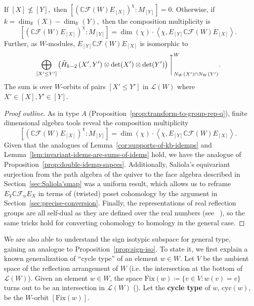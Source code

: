 \documentclass[ALCO, Unicode]{cedram}
\def\C{{\mathbb{C}}}
\begin{document}
 \begin{prop}\label{gen-of-cor:induced-cohomology}
      If $[X]\nleq [Y],$ then $\left[\left(\C \mathcal{F}(W) E_{[X]}\right)^\chi:M_{[Y]}\right] = 0.$ Otherwise, if $k = \dim_{\mathbb{R}}(X) - \dim_{\mathbb{R}}(Y),$ then the composition multiplicity is \[\left[\left(\C \mathcal{F}(W) E_{[X]}\right)^\chi:M_{[Y]}\right] = \dim \left(\chi \right)\cdot \left \langle \chi, E_{[Y]}\C \mathcal{F}(W) E_{[X]}\right\rangle.\] Further, as $W$-modules, $E_{[Y]}\C \mathcal{F}(W) E_{[X]}$ is isomorphic to
     \begin{align*}
        \bigoplus_{[X' \leq Y']}\left (\Tilde{{H}}_{k - 2} \left(X', Y'\right) \otimes \det(X') \otimes \det(Y') \right)\Bigg \uparrow_{N_W(X') \cap N_W(Y')}^W.
     \end{align*}
     The sum is over $W$-orbits of pairs $[X' \leq Y']$ in $\mathcal{L}(W)$ where $X' \in [X], Y' \in [Y].$ 
 \end{prop}
 \begin{proof}[Proof outline] As in type $A$ (Proposition~\ref{prop:transform-to-group-rep-q}), finite dimensional algebra tools reveal the composition multiplicity \[\left[\left ( \C \mathcal{F}(W) E_{[X]}\right)^\chi: M_{[Y]}\right] = \dim \left(\chi \right)\cdot \left \langle \chi, E_{[Y]}\C \mathcal{F}(W) E_{[X]}\right\rangle.\] 
 Given that the analogues of Lemma~\ref{cor:supports-of-kb-idemps} and Lemma~\ref{lem:invariant-idems-are-sums-of-idems} hold, we have the analogue of Proposition~\ref{prop:double-idemp-sapces}. Additionally, Saliola's equivariant surjection from the path algebra of the quiver to the face algebra described in Section~\ref{sec:Saliola'smap} was a uniform result, which allows us to reframe $E_Y \C \mathcal{F}_n E_X$ in terms of (twisted) poset cohomology by the argument in Section~\ref{sec:precise-conversion}. Finally, the representations of real reflection groups are all self-dual as they are defined over the real numbers (see ~\cite{BENARD1976318}), so the same tricks hold for converting cohomology to homology in the general case.
 \end{proof}

 We are also able to understand the sign isotypic subspace for general type, gaining an analogue to Proposition~\ref{prop:sign-iso}. To state it, we first explain a known generalization of ``cycle type'' of an element $w \in W.$ 
Let $V$ be the ambient space of the reflection arrangement of $W$ (i.e. the intersection at the bottom of $\mathcal{L}(W)$).  Given an element $w \in W$, the space $\mathrm{Fix}(w) \coloneqq  \{v \in V: w(v) = v\}$ turns out to be an intersection in $\mathcal{L}(W)$ (\cite[Theorem 6.27]{orlik2013arrangements}). Let the \textbf{cycle type} of $w$, $\mathrm{cyc}(w)$, be the $W$-orbit $[\mathrm{Fix}(w)].$ 
\end{document}
